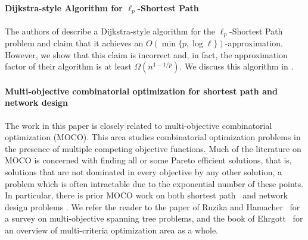\documentclass[11pt,a4paper]{article}
\begin{document}
\paragraph{Dijkstra-style Algorithm for $\ell_p$-Shortest Path} The authors of \cite{bilo2017simple} describe a Dijkstra-style algorithm for the $\ell_p$-Shortest Path problem and claim that it achieves an $O(\min\{p,\log \ell\})$-approximation. However, we show that this claim is incorrect and, in fact, the approximation factor of their algorithm is at least $\Omega(n^{1-1/p})$. We discuss this algorithm in .

\paragraph{Multi-objective combinatorial optimization for shortest path and network design} The work in this paper is closely related to multi-objective combinatorial optimization (MOCO). This area studies combinatorial optimization problems in the presence of multiple competing objective functions. Much of the literature on MOCO is concerned with finding all or some Pareto efficient solutions, that is, solutions that are not dominated in every objective by any other solution, a problem which is often intractable due to the exponential number of these points. In particular, there is prior MOCO work on both shortest path~\cite{hansen1980bicriterion,martins1984multicriteria,breugem2017analysis} and network design problems \cite{ravi1993many}. We refer the reader to the paper of Ruzika and Hamacher~\cite{ruzika2009survey} for a survey on multi-objective spanning tree problems, and the book of Ehrgott~\cite{ehrgott2005multicriteria} for an overview of multi-criteria optimization area as a whole.

\end{document}
